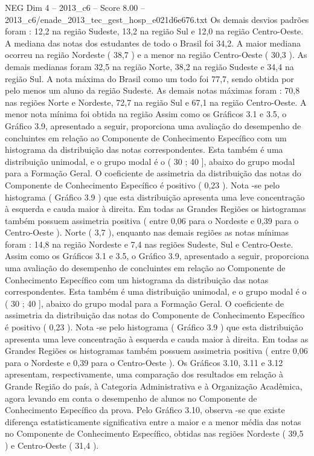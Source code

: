 \begin{textsample}{NEG Dim 4 – 2013\_c6 – Score 8.00 – 2013\_c6/enade\_2013\_tec\_gest\_hosp\_e021d6e676.txt}
Os demais desvios padrões foram : 12,2 na região Sudeste, 13,2 na região Sul e 12,0 na região Centro-Oeste.
A mediana das notas dos estudantes de todo o Brasil foi 34,2.
A maior mediana ocorreu na região Nordeste ( 38,7 ) e a menor na região Centro-Oeste ( 30,3 ).
As demais medianas foram 32,5 na região Norte, 38,2 na região Sudeste e 34,4 na região Sul.
A nota máxima do Brasil como um todo foi 77,7, sendo obtida por pelo menos um aluno da região Sudeste.
As demais notas máximas foram : 70,8 nas regiões Norte e Nordeste, 72,7 na região Sul e 67,1 na região Centro-Oeste.
A menor nota mínima foi obtida na região Assim como os Gráficos 3.1 e 3.5, o Gráfico 3.9, apresentado a seguir, proporciona uma avaliação do desempenho de concluintes em relação ao Componente de Conhecimento Específico com um histograma da distribuição das notas correspondentes.
Esta também é uma distribuição unimodal, e o grupo modal é o ( 30 ; 40 ], abaixo do grupo modal para a Formação Geral.
O coeficiente de assimetria da distribuição das notas do Componente de Conhecimento Específico é positivo ( 0,23 ).
Nota -se pelo histograma ( Gráfico 3.9 ) que esta distribuição apresenta uma leve concentração à esquerda e cauda maior à direita.
Em todas as Grandes Regiões os histogramas também possuem assimetria positiva ( entre 0,06 para o Nordeste e 0,39 para o Centro-Oeste ).
Norte ( 3,7 ), enquanto nas demais regiões as notas mínimas foram : 14,8 na região Nordeste e 7,4 nas regiões Sudeste, Sul e Centro-Oeste.
Assim como os Gráficos 3.1 e 3.5, o Gráfico 3.9, apresentado a seguir, proporciona uma avaliação do desempenho de concluintes em relação ao Componente de Conhecimento Específico com um histograma da distribuição das notas correspondentes.
Esta também é uma distribuição unimodal, e o grupo modal é o ( 30 ; 40 ], abaixo do grupo modal para a Formação Geral.
O coeficiente de assimetria da distribuição das notas do Componente de Conhecimento Específico é positivo ( 0,23 ).
Nota -se pelo histograma ( Gráfico 3.9 ) que esta distribuição apresenta uma leve concentração à esquerda e cauda maior à direita.
Em todas as Grandes Regiões os histogramas também possuem assimetria positiva ( entre 0,06 para o Nordeste e 0,39 para o Centro-Oeste ).
Os Gráficos 3.10, 3.11 e 3.12 apresentam, respectivamente, uma comparação dos resultados em relação à Grande Região do país, à Categoria Administrativa e à Organização Acadêmica, agora levando em conta o desempenho de alunos no Componente de Conhecimento Específico da prova.
Pelo Gráfico 3.10, observa -se que existe diferença estatisticamente significativa entre a maior e a menor média das notas no Componente de Conhecimento Específico, obtidas nas regiões Nordeste ( 39,5 ) e Centro-Oeste ( 31,4 ).

\end{textsample}
